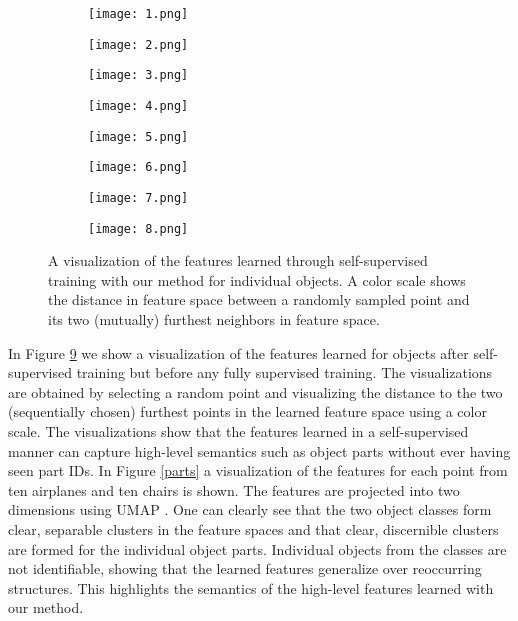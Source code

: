\documentclass{article}
\begin{document}
\begin{figure}[b]
\vskip -0.1in
  \begin{subfigure}{.245\linewidth}
  \centering
  \texttt{[image: 1.png]}
  \label{fig2:sub1}
  \end{subfigure}\begin{subfigure}{.245\linewidth}
  \centering
  \texttt{[image: 2.png]}
  \label{fig2:sub2}
  \end{subfigure}
  \begin{subfigure}{.245\linewidth}
  \centering
  \texttt{[image: 3.png]}
  \label{fig2:sub3}
  \end{subfigure}
  \begin{subfigure}{.245\linewidth}
  \centering
  \texttt{[image: 4.png]}
  \label{fig2:sub4}
  \end{subfigure}
  \vskip -0.2in
  \begin{subfigure}{.245\linewidth}
  \centering
  \texttt{[image: 5.png]}
  \label{fig2:sub5}
  \end{subfigure}\begin{subfigure}{.245\linewidth}
  \centering
  \texttt{[image: 6.png]}
  \label{fig2:sub6}
  \end{subfigure}
  \begin{subfigure}{.245\linewidth}
  \centering
  \texttt{[image: 7.png]}
  \label{fig2:sub7}
  \end{subfigure}
  \begin{subfigure}{.245\linewidth}
  \centering
  \texttt{[image: 8.png]}
  \label{fig2:sub8}
  \end{subfigure}
  \vskip -0.15in
  \caption{A visualization of the features learned through self-supervised training with our method for individual objects. A color scale shows the distance in feature space between a randomly sampled point and its two (mutually) furthest neighbors in feature space.}
  \label{objects}
\end{figure}

In Figure \ref{objects} we show a visualization of the features learned for objects after self-supervised training but before any fully supervised training. The visualizations are obtained by selecting a random point and visualizing the distance to the two (sequentially chosen) furthest points in the learned feature space using a color scale. The visualizations show that the features learned in a self-supervised manner can capture high-level semantics such as object parts without ever having seen part IDs. In Figure \ref{parts} a visualization of the features for each point from ten airplanes and ten chairs is shown. The features are projected into two dimensions using UMAP \cite{umap}. One can clearly see that the two object classes form clear, separable clusters in the feature spaces and that clear, discernible clusters are formed for the individual object parts. Individual objects from the classes are not identifiable, showing that the learned features generalize over reoccurring structures. This highlights the semantics of the high-level features learned with our method.
\end{document}
